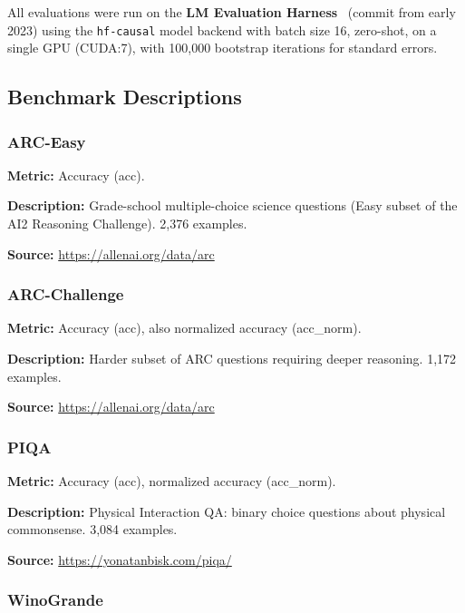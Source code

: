 \documentclass[11pt,a4paper]{article}
\begin{document}
All evaluations were run on the \textbf{LM Evaluation Harness}~\cite{lm-eval-harness} (commit from early 2023) using the \texttt{hf-causal} model backend with batch size 16, zero-shot, on a single GPU (CUDA:7), with 100,000 bootstrap iterations for standard errors.

\subsection{Benchmark Descriptions}

\subsubsection{ARC-Easy}
\label{bench:arc_easy}

\textbf{Metric:} Accuracy (acc).

\textbf{Description:} Grade-school multiple-choice science questions (Easy subset of the AI2 Reasoning Challenge). 2,376 examples.

\textbf{Source:} \url{https://allenai.org/data/arc}

\subsubsection{ARC-Challenge}
\label{bench:arc_challenge}

\textbf{Metric:} Accuracy (acc), also normalized accuracy (acc\_norm).

\textbf{Description:} Harder subset of ARC questions requiring deeper reasoning. 1,172 examples.

\textbf{Source:} \url{https://allenai.org/data/arc}

\subsubsection{PIQA}
\label{bench:piqa}

\textbf{Metric:} Accuracy (acc), normalized accuracy (acc\_norm).

\textbf{Description:} Physical Interaction QA: binary choice questions about physical commonsense. 3,084 examples.

\textbf{Source:} \url{https://yonatanbisk.com/piqa/}

\subsubsection{WinoGrande}
\label{bench:winogrande}
\end{document}
